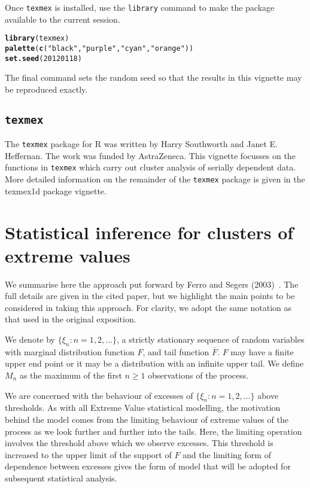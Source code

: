 \documentclass[10pt]{article}\usepackage[]{graphicx}\usepackage[]{color}
\makeatletter
\newcommand{\hlnum}[1]{\textcolor[rgb]{0.686,0.059,0.569}{#1}}%
\newcommand{\hlstr}[1]{\textcolor[rgb]{0.192,0.494,0.8}{#1}}%
\newcommand{\hlstd}[1]{\textcolor[rgb]{0.345,0.345,0.345}{#1}}%
\newcommand{\hlkwd}[1]{\textcolor[rgb]{0.737,0.353,0.396}{\textbf{#1}}}%
\newenvironment{kframe}{%
 \def\at@end@of@kframe{}%
 \ifinner\ifhmode%
  \def\at@end@of@kframe{\end{minipage}}%
  \begin{minipage}{\columnwidth}%
 \fi\fi%
 \def\FrameCommand##1{\hskip\@totalleftmargin \hskip-\fboxsep
 \colorbox{shadecolor}{##1}\hskip-\fboxsep
     \hskip-\linewidth \hskip-\@totalleftmargin \hskip\columnwidth}%
 \MakeFramed {\advance\hsize-\width
   \@totalleftmargin\z@ \linewidth\hsize
   \@setminipage}}%
 {\par\unskip\endMakeFramed%
 \at@end@of@kframe}
\newenvironment{knitrout}{}{} %
\makeatother
\begin{document}
Once {\tt texmex} is installed, use the {\tt library} command to make the package available to the current session.

\begin{knitrout}
\color{fgcolor}\begin{kframe}
\begin{alltt}
\hlkwd{library}\hlstd{(texmex)}
\hlkwd{palette}\hlstd{(}\hlkwd{c}\hlstd{(}\hlstr{"black"}\hlstd{,}\hlstr{"purple"}\hlstd{,}\hlstr{"cyan"}\hlstd{,}\hlstr{"orange"}\hlstd{))}
\hlkwd{set.seed}\hlstd{(}\hlnum{20120118}\hlstd{)}
\end{alltt}
\end{kframe}
\end{knitrout}
The final command sets the random seed so that the results in this vignette may be reproduced exactly.
%
\subsection{\tt texmex}
%
The {\tt texmex} package for R was written by Harry Southworth
and Janet E. Heffernan. The work was funded by AstraZeneca.  This vignette focusses on the functions in {\tt texmex} which carry out cluster analysis of serially dependent data.  More detailed information on the remainder of the {\tt texmex} package is given in the texmex1d package vignette.
%
\section{Statistical inference for clusters of extreme values}
%
We summarise here the approach put forward by Ferro and Segers (2003)~\cite{FerroSegers2003}.  The full details are given in the cited paper, but we highlight the main points to be considered in taking this approach.  For clarity, we adopt the same notation as that used in the original exposition.

We denote by $\{\xi_n: n=1,2,\ldots\}$, a strictly stationary sequence of random variables with marginal distribution function $F$, and tail function $\overline F$.  $F$ may have a finite upper end point or it may be a distribution with an infinite upper tail. We define $M_n$ as the maximum of the first $n\geq1$ observations of the process.

We are concerned with the behaviour of excesses of $\{\xi_n:n=1,2,\ldots\}$ above thresholds.  As with all Extreme Value statistical modelling, the motivation behind the model comes from the limiting behaviour of extreme values of the process as we look further and further into the tails.  Here, the limiting operation involves the threshold above which we observe excesses.  This threshold is increased to the upper limit of the support of $F$ and the limiting form of dependence between excesses gives the form of model that will be adopted for subsequent statistical analysis.
\end{document}
